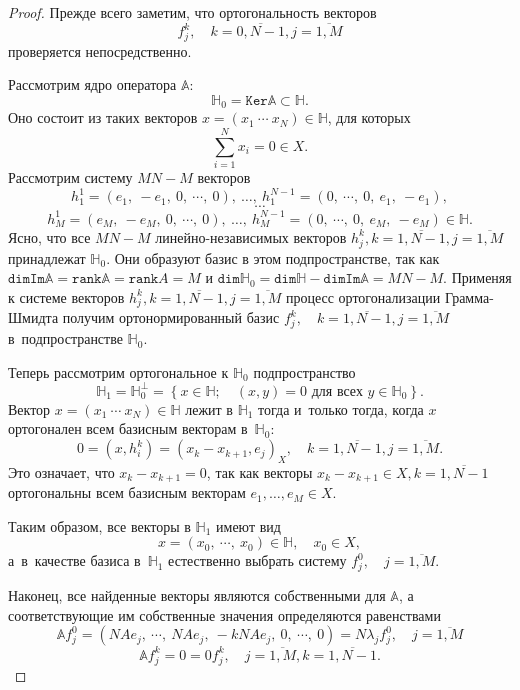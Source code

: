  \begin{proof}
     Прежде всего заметим, что ортогональность векторов
     \[ f_j^k, \quad k=\overline{0,N-1}, j=\overline{1,M} \]
     проверяется непосредственно.

     Рассмотрим ядро оператора \( \mathbb{A} \):
     \[ \mathbb{H}_0 = \mathtt{Ker}\mathbb{A} \subset \mathbb{H}. \]
     Оно состоит из таких векторов \( x = (x_1 ~\cdots~ x_N) \in \mathbb{H} \),
     для которых \[ \sum_{i=1}^N x_i = 0 \in X. \]
     Рассмотрим систему \( MN - M \) векторов
     \[ h_1^1 = ( e_1, ~ -e_1, ~ 0, ~\cdots, ~ 0), ~ \ldots, ~ h_1^{N-1} = (0, ~\cdots,~ 0, ~ e_1, ~ -e_1), \]
     \[ \cdots \]
     \[ h_M^1 = ( e_M, ~ -e_M, ~ 0, ~\cdots, ~ 0), ~ \ldots, ~ h_M^{N-1} = (0, ~\cdots,~ 0, ~ e_M, ~ -e_M) \in \mathbb{H}. \]
     Ясно, что все \( MN - M \) линейно-независимых векторов
     \( h_j^k, k=\overline{1,N-1},j=\overline{1,M} \)
     принадлежат \( \mathbb{H}_0 \).
     Они образуют базис в этом подпространстве, так как
     \( \mathtt{dim}\mathtt{Im}\mathbb{A} = \mathtt{rank}\mathbb{A} = \mathtt{rank}A = M \)
     и \( \mathtt{dim}\mathbb{H}_0 = \mathtt{dim}\mathbb{H} - \mathtt{dim}\mathtt{Im}\mathbb{A} = MN - M \).
     Применяя к системе векторов \( h_j^k, k=\overline{1,N-1},j=\overline{1,M} \) процесс ортогонализации Грамма-Шмидта
     получим ортонормированный базис \( f_j^k, \quad k=\overline{1,N-1},j=\overline{1,M}\) в~подпространстве \( \mathbb{H}_0 \).

     Теперь рассмотрим ортогональное к \( \mathbb{H}_0 \) подпространство
     \[ \mathbb{H}_1 = \mathbb{H}_0^\perp = \left\{ x\in\mathbb{H};\quad (x,y)=0 \text{ для всех } y\in\mathbb{H}_0 \right\}. \]
     Вектор \( x=(x_1 ~\cdots~ x_N)\in\mathbb{H} \) лежит в \( \mathbb{H}_1 \)
     тогда и~только тогда, когда
     \( x \) ортогонален всем базисным векторам в~\( \mathbb{H}_0 \):
     \[ 0 = (x,h_i^k) = (x_k - x_{k+1}, e_j)_X, \quad k=\overline{1,N-1}, j=\overline{1,M}. \]
     Это означает, что \( x_k - x_{k+1} = 0 \), так как векторы \( x_k - x_{k+1} \in X, k=\overline{1,N-1} \)
     ортогональны всем базисным векторам \( e_1, \ldots, e_M \in X \).

     Таким образом, все векторы в \( \mathbb{H}_1 \) имеют вид
     \[ x = (x_0, ~\cdots, ~ x_0)\in\mathbb{H}, \quad x_0\in X, \]
     а~в~качестве базиса в~\( \mathbb{H}_1 \) естественно выбрать
     систему \( f_j^0, \quad j=\overline{1,M} \).

     Наконец, все найденные векторы являются собственными для \( \mathbb{A} \),
     а соответствующие им собственные значения определяются равенствами
     \[ \mathbb{A} f_j^0 = ( N A e_j, ~ \cdots, ~ NA e_j, ~ -kNAe_j, ~ 0, ~ \cdots, ~ 0 ) = N\lambda_j f_j^0, \quad j=\overline{1,M} \]
     \[ \mathbb{A} f_j^k = 0 = 0 f_j^k, \quad j=\overline{1,M}, k=\overline{1,N-1}. \]
 \end{proof}

